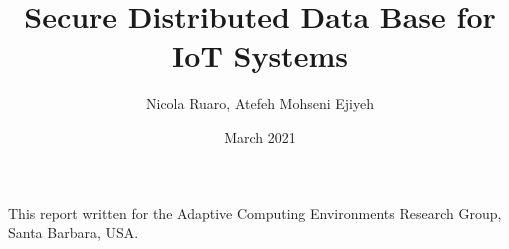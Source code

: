 \documentclass[11pt]{article}
\title{Secure Distributed Data Base for IoT Systems}
\author{Nicola Ruaro, Atefeh Mohseni Ejiyeh}
\date{March 2021}
\begin{document}
\graphicspath{{Figures/}}

\maketitle


This report written for the Adaptive Computing Environments Research Group, Santa Barbara, USA.









\end{document}
